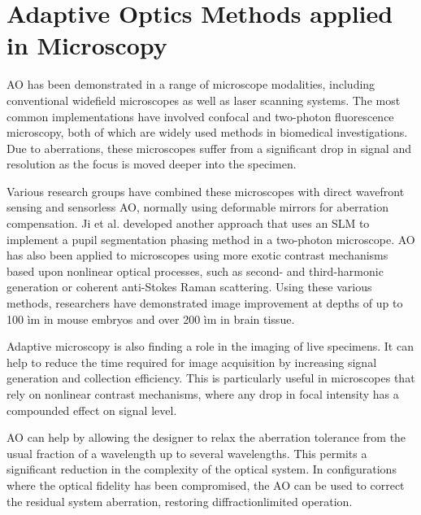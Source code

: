 
\section{Adaptive Optics Methods applied in Microscopy}
\label{sec:ExperimentDiscussion}

AO has been demonstrated in a range of microscope modalities, including 
conventional widefield microscopes as well as laser scanning systems. The 
most common implementations have involved confocal and two-photon 
fluorescence microscopy, both of which are widely used methods in biomedical 
investigations. Due to aberrations, these microscopes suffer from a 
significant drop in signal and resolution as the focus is moved deeper into 
the specimen. 

Various research groups have combined these microscopes with direct wavefront 
sensing and sensorless AO, normally using deformable mirrors for aberration 
compensation. Ji et al. developed another approach that uses an SLM to 
implement a pupil segmentation phasing method in a two-photon microscope. AO 
has also been applied to microscopes using more exotic contrast mechanisms 
based upon nonlinear optical processes, such as second- and third-harmonic 
generation or coherent anti-Stokes Raman scattering. Using these various 
methods, researchers have demonstrated image improvement at depths of up to 
100 ìm in mouse embryos and over 200 ìm in brain tissue.

Adaptive microscopy is also finding a role in the imaging of live specimens. 
It can help to reduce the time required for image acquisition by increasing 
signal generation and collection efficiency. This is particularly useful in 
microscopes that rely on nonlinear contrast mechanisms, where any drop in 
focal intensity has a compounded effect on signal level.

AO can help by allowing the designer to relax the aberration tolerance from 
the usual fraction of a wavelength up to several wavelengths. This permits a 
significant reduction in the complexity of the optical system. In 
configurations where the optical fidelity has been compromised, the AO can be 
used to correct the residual system aberration, restoring diffractionlimited 
operation.


